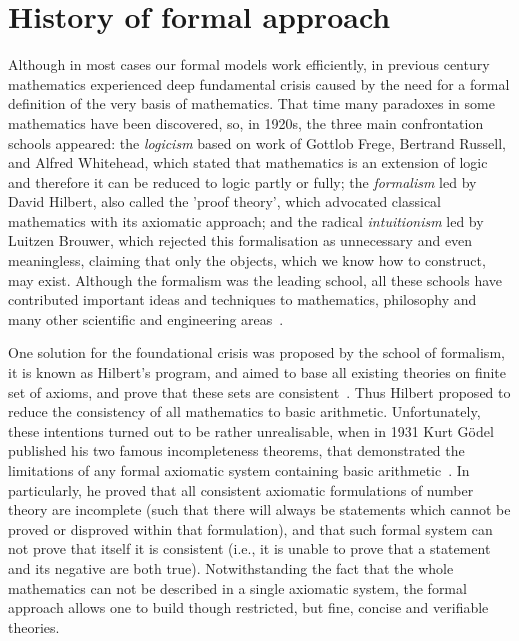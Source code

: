 \documentclass[article]{aaltoseries}
\begin{document}
\section{History of formal approach}
\label{sec:formal_history}

Although in most cases our formal models work efficiently, in previous century mathematics experienced deep fundamental crisis caused by the need for a formal definition of the very basis of mathematics. That time many paradoxes in some mathematics have been discovered, so, in 1920s, the three main confrontation schools appeared:
the \textit{logicism} based on work of Gottlob Frege, Bertrand Russell, and Alfred Whitehead, which stated that mathematics is an extension of logic and therefore it can be reduced to logic partly or fully;
the \textit{formalism} led by David Hilbert, also called the 'proof theory', which advocated classical mathematics with its axiomatic approach;
and the radical \textit{intuitionism} led by Luitzen Brouwer, which rejected this formalisation as unnecessary and even meaningless, claiming that only the objects, which we know how to construct, may exist.
Although the formalism was the leading school, all these schools have contributed important ideas and techniques to mathematics, philosophy and many other scientific and engineering areas~\cite{Fer08}.

One solution for the foundational crisis was proposed by the school of formalism, it is known as Hilbert's program, and aimed to base all existing theories on finite set of axioms, and prove that these sets are consistent~\cite{Zac06}. Thus Hilbert proposed to reduce the consistency of all mathematics to basic arithmetic. 
Unfortunately, these intentions turned out to be rather unrealisable, when in 1931 Kurt Gödel published his two famous incompleteness theorems, that demonstrated the limitations of any formal axiomatic system containing basic arithmetic~\cite{Raa15}. In particularly, he proved that all consistent axiomatic formulations of number theory are incomplete (such that there will always be statements which cannot be proved or disproved within that formulation), and that such formal system can not prove that itself it is consistent (i.e., it is unable to prove that a statement and its negative are both true).
Notwithstanding the fact that the whole mathematics can not be described in a single axiomatic system, the formal approach allows one to build though restricted, but fine, concise and verifiable theories.

\end{document}

